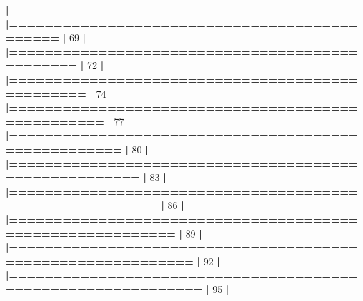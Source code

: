 \documentclass[]{book}
\newenvironment{Shaded}{\begin{snugshade}}{\end{snugshade}}
\newcommand{\DecValTok}[1]{\textcolor[rgb]{0.00,0.00,0.81}{#1}}
\newcommand{\ErrorTok}[1]{\textcolor[rgb]{0.64,0.00,0.00}{\textbf{#1}}}
\newcommand{\NormalTok}[1]{#1}
\newcommand{\OperatorTok}[1]{\textcolor[rgb]{0.81,0.36,0.00}{\textbf{#1}}}
\newcommand{\StringTok}[1]{\textcolor[rgb]{0.31,0.60,0.02}{#1}}
\begin{document}
\begin{Shaded}
\begin{Highlighting}[]
{{{{{{{{{{{{{{{{{{{{{{{{{  \OperatorTok{|}\StringTok{                                                                       }
\StringTok{  }\ErrorTok{|=============================================}\StringTok{                    }\ErrorTok{|}\StringTok{  }\DecValTok{69}\NormalTok{%}
  \OperatorTok{|}\StringTok{                                                                       }
\StringTok{  }\ErrorTok{|===============================================}\StringTok{                  }\ErrorTok{|}\StringTok{  }\DecValTok{72}\NormalTok{%}
  \OperatorTok{|}\StringTok{                                                                       }
\StringTok{  }\ErrorTok{|================================================}\StringTok{                 }\ErrorTok{|}\StringTok{  }\DecValTok{74}\NormalTok{%}
  \OperatorTok{|}\StringTok{                                                                       }
\StringTok{  }\ErrorTok{|==================================================}\StringTok{               }\ErrorTok{|}\StringTok{  }\DecValTok{77}\NormalTok{%}
  \OperatorTok{|}\StringTok{                                                                       }
\StringTok{  }\ErrorTok{|====================================================}\StringTok{             }\ErrorTok{|}\StringTok{  }\DecValTok{80}\NormalTok{%}
  \OperatorTok{|}\StringTok{                                                                       }
\StringTok{  }\ErrorTok{|======================================================}\StringTok{           }\ErrorTok{|}\StringTok{  }\DecValTok{83}\NormalTok{%}
  \OperatorTok{|}\StringTok{                                                                       }
\StringTok{  }\ErrorTok{|========================================================}\StringTok{         }\ErrorTok{|}\StringTok{  }\DecValTok{86}\NormalTok{%}
  \OperatorTok{|}\StringTok{                                                                       }
\StringTok{  }\ErrorTok{|==========================================================}\StringTok{       }\ErrorTok{|}\StringTok{  }\DecValTok{89}\NormalTok{%}
  \OperatorTok{|}\StringTok{                                                                       }
\StringTok{  }\ErrorTok{|============================================================}\StringTok{     }\ErrorTok{|}\StringTok{  }\DecValTok{92}\NormalTok{%}
  \OperatorTok{|}\StringTok{                                                                       }
\StringTok{  }\ErrorTok{|=============================================================}\StringTok{    }\ErrorTok{|}\StringTok{  }\DecValTok{95}\NormalTok{%}
  \OperatorTok{|}\StringTok{                                                                       }
}}}}}}}}}}}}}}}}}}}}}}}}}}}}}}}}}}}
\end{Highlighting}
\end{Shaded}
\end{document}
